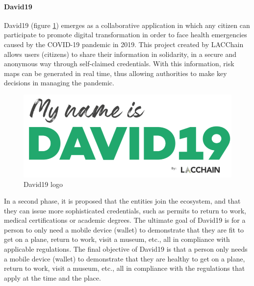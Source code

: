 \documentclass[a4paper, 12pt]{article} %
\begin{document}
                \paragraph{David19}
                    David19\cite{david19} (figure \ref{fig:david19}) emerges as a collaborative application in which any citizen can participate to promote digital transformation in order to face health emergencies caused by the COVID-19 pandemic in 2019. This project created by LACChain\cite{lacchain} allows users (citizens) to share their information in solidarity, in a secure and anonymous way through self-claimed credentials. With this information, risk maps can be generated in real time, thus allowing authorities to make key decisions in managing the pandemic.\\
                    \begin{figure}[h]
                        \centering
                        \includegraphics[width=.3\textwidth]{logo-david19.png}
                        \caption{David19 logo}
                        \label{fig:david19}
                    \end{figure}
                    
                    In a second phase\cite{que-es-david19}, it is proposed that the entities join the ecosystem, and that they can issue more sophisticated credentials, such as permits to return to work, medical certifications or academic degrees. The ultimate goal of David19 is for a person to only need a mobile device (wallet) to demonstrate that they are fit to get on a plane, return to work, visit a museum, etc., all in compliance with applicable regulations. The final objective of David19 is that a person only needs a mobile device (wallet) to demonstrate that they are healthy to get on a plane, return to work, visit a museum, etc., all in compliance with the regulations that apply at the time and the place.
\end{document}

